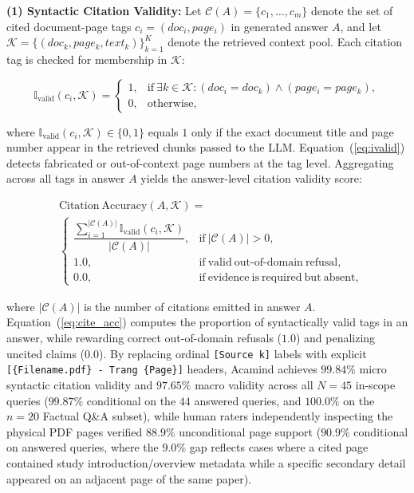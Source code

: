 \documentclass[10pt]{SPIIRAS_Proceedings}
\begin{document}
\textbf{(1) Syntactic Citation Validity:} Let $\mathcal{C}(A) = \{c_1, \dots, c_m\}$ denote the set of cited document-page tags $c_i = (doc_i, page_i)$ in generated answer $A$, and let $\mathcal{K} = \{(doc_k, page_k, text_k)\}_{k=1}^K$ denote the retrieved context pool. Each citation tag is checked for membership in $\mathcal{K}$:

\begin{equation}
\mathbb{I}_{\mathrm{valid}}(c_i, \mathcal{K}) = 
\begin{cases} 
1, & \mathrm{if}\ \exists k \in \mathcal{K}: (doc_i = doc_k) \land (page_i = page_k), \\
0, & \mathrm{otherwise},
\end{cases}
\label{eq:ivalid}
\end{equation}

\noindent where $\mathbb{I}_{\mathrm{valid}}(c_i, \mathcal{K}) \in \{0, 1\}$ equals $1$ only if the exact document title and page number appear in the retrieved chunks passed to the LLM. Equation~(\ref{eq:ivalid}) detects fabricated or out-of-context page numbers at the tag level. Aggregating across all tags in answer $A$ yields the answer-level citation validity score:

\begin{equation}
\begin{aligned}
&\mathrm{Citation\ Accuracy}(A,\mathcal{K}) =\\
&\begin{cases}
\dfrac{
\sum_{i=1}^{|\mathcal{C}(A)|}
\mathbb{I}_{\mathrm{valid}}(c_i,\mathcal{K})
}{
|\mathcal{C}(A)|
},
& \mathrm{if}\ |\mathcal{C}(A)|>0,
\\[8pt]
1.0,
& \mathrm{if\ valid\ out\text{-}of\text{-}domain\ refusal},
\\[6pt]
0.0,
& \mathrm{if\ evidence\ is\ required\ but\ absent},
\end{cases}
\end{aligned}
\label{eq:cite_acc}
\end{equation}

\noindent where $|\mathcal{C}(A)|$ is the number of citations emitted in answer $A$. Equation~(\ref{eq:cite_acc}) computes the proportion of syntactically valid tags in an answer, while rewarding correct out-of-domain refusals ($1.0$) and penalizing uncited claims ($0.0$). By replacing ordinal \texttt{[Source k]} labels with explicit \texttt{[\{Filename.pdf\} - Trang \{Page\}]} headers, Acamind achieves $99.84\%$ micro syntactic citation validity and $97.65\%$ macro validity across all $N = 45$ in-scope queries ($99.87\%$ conditional on the $44$ answered queries, and $100.0\%$ on the $n = 20$ Factual Q\&A subset), while human raters independently inspecting the physical PDF pages verified $88.9\%$ unconditional page support ($90.9\%$ conditional on answered queries, where the $9.0\%$ gap reflects cases where a cited page contained study introduction/overview metadata while a specific secondary detail appeared on an adjacent page of the same paper).
\end{document}
